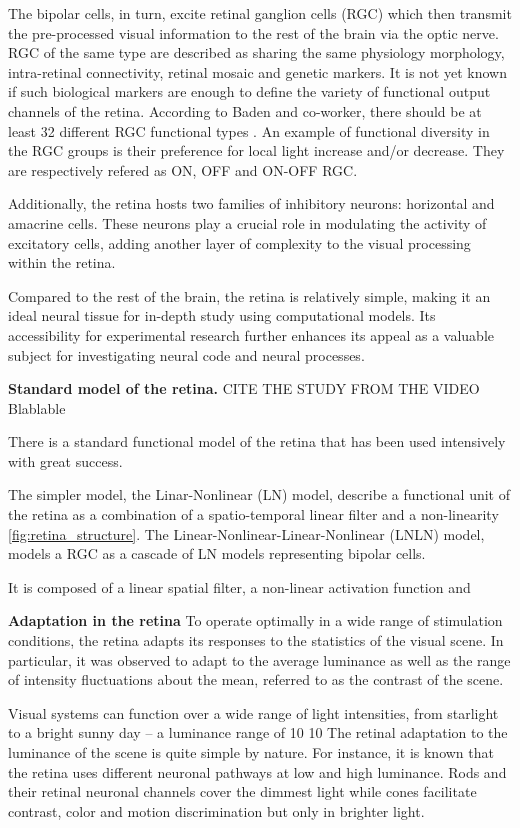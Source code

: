 The bipolar cells, in turn, excite retinal ganglion cells (RGC) which then
transmit the pre-processed visual  information to the rest of the
brain via the optic nerve.
RGC of the same type are described as sharing the same
physiology morphology,
intra-retinal connectivity, retinal mosaic and genetic markers. It is not yet
known if such biological markers are enough to define the variety of functional
output channels of the retina. According to Baden and co-worker, there should
be at least 32 different RGC
functional types \citep*{baden_functional_2016}. An example of functional
diversity in the RGC groups is their preference for local light increase and/or
decrease. They are respectively refered as ON, OFF and ON-OFF RGC.

Additionally, the retina hosts two families of inhibitory neurons: horizontal
and
amacrine cells. These neurons play a crucial role in modulating the activity of
excitatory cells, adding another layer of complexity to the visual processing
within the retina.

Compared to the rest of the brain, the retina is relatively simple,
making it an ideal neural tissue for in-depth study using computational models.
Its accessibility for experimental research further enhances its appeal as a
valuable subject for investigating neural code and neural processes.

\textbf{Standard model of the retina.}
CITE THE STUDY FROM THE VIDEO Blablable

There is a standard functional model of the retina that has been used
intensively with great success.

The simpler model, the Linar-Nonlinear (LN) model, describe a functional unit
of the retina as a combination of a spatio-temporal linear filter and a
non-linearity \ref{fig:retina_structure}.
The Linear-Nonlinear-Linear-Nonlinear (LNLN) model, models a RGC as a cascade
of LN models representing bipolar cells.

It is composed of a linear spatial filter, a non-linear activation function and

\textbf{Adaptation in the retina}
To operate optimally in a wide range of
stimulation conditions, the retina adapts its responses to the statistics of
the visual scene.
In particular, it was observed to adapt to the average
luminance as well as the range of intensity fluctuations about the mean,
referred to as the contrast of the scene.

Visual systems can function over a wide range of light intensities, from
starlight to a bright sunny day – a luminance range of 10 10
The retinal adaptation to the luminance of the scene is quite simple by nature.
For instance, it is known that the retina uses different neuronal
pathways at low and high luminance. Rods and their retinal neuronal channels
cover the dimmest light while cones facilitate contrast, color and motion
discrimination but only in brighter light.


